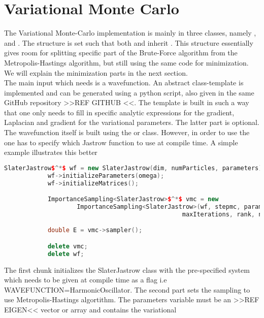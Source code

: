\section{Variational Monte Carlo}
    The Variational Monte-Carlo implementation is mainly in three classes,
    namely ,  and
    . The structure is set such that both
     and  inherit
    . This structure essentially gives room for splitting
    specific part of the Brute-Force algorithm from the Metropolis-Hastings
    algorithm, but still using the same code for minimization. We will explain
    the minimization parts in the next section. \\ 
    The main input which  needs is a wavefunction. An abstract
    class-template is implemented and can be generated using a python script,
    also given in the same GitHub repository >>REF GITHUB <<. The template is
    built in such a way that one only needs to fill in specific analytic
    expressions for the gradient, Laplacian and gradient for the variational
    parameters. The latter part is optional. \\ 
    The wavefunction itself is built using the  or
     class. However, in order to use the
     one has to specify which Jastrow function to use
    at compile time. A simple example illustrates this better
        \begin{lstlisting}[language=C++, style=ccstyle]
            SlaterJastrow$^*$ wf = new SlaterJastrow(dim, numParticles, parameters);
            wf->initializeParameters(omega);
            wf->initializeMatrices();

            ImportanceSampling<SlaterJastrow>$^*$ vmc = new
                    ImportanceSampling<SlaterJastrow>(wf, stepmc, parameters,
                                                 maxIterations, rank, numProcs);

            double E = vmc->sampler();

            delete vmc;
            delete wf;
        \end{lstlisting}
    The first chunk initializes the SlaterJastrow class with the pre-specified
    system which needs to be given at compile time as a flag i.e
    WAVEFUNCTION=HarmonicOscillator. The second part sets the sampling to use
    Metropolis-Hastings algortithm. The parameters variable must be an
     >>REF EIGEN<< vector or array and contains the variational
